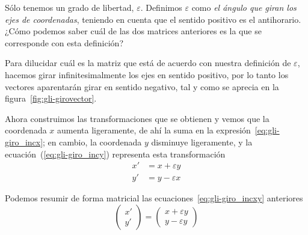 Sólo tenemos un grado de libertad, $\varepsilon$.
Definimos $\varepsilon$ como \emph{el ángulo que giran los ejes de coordenadas}, teniendo en cuenta que el sentido positivo es el antihorario.
¿Cómo podemos saber cuál de las dos matrices anteriores es la que se corresponde con esta definición?

Para dilucidar cuál es la matriz que está de acuerdo con nuestra definición de $\varepsilon$, hacemos girar infinitesimalmente los ejes en sentido positivo, por lo tanto los vectores aparentarán girar en sentido negativo, tal y como se aprecia en la figura~\ref{fig:gli-girovector}.

Ahora construimos las transformaciones que se obtienen y vemos que la coordenada $x$ aumenta ligeramente, de ahí la suma en la expresión~\eqref{eq:gli-giro_incx}; en cambio, la coordenada $y$ disminuye ligeramente, y la ecuación~(\ref{eq:gli-giro_incy}) representa
esta transformación
\begin{subequations}\label{eq:gli-giro_incxy}
  \begin{align}
    \label{eq:gli-giro_incx}
    x' &= x + \varepsilon y \\
    \label{eq:gli-giro_incy}
    y' &= y - \varepsilon x
  \end{align}
\end{subequations}

Podemos resumir de forma matricial las ecuaciones~\eqref{eq:gli-giro_incxy} anteriores
\begin{equation}\label{eq:gli-giro_incxy_matricial}
  \begin{pmatrix}
    x' \\ y'
  \end{pmatrix}
  = \begin{pmatrix}
    x + \varepsilon y\\
    y - \varepsilon y
    \end{pmatrix}
\end{equation}

